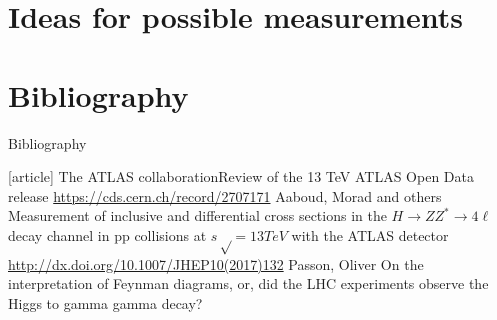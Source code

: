 \documentclass[aspectratio=1610, english]{beamer}
\newcommand{\hzz}{ H\rightarrow ZZ^{*}\rightarrow 4 \ell}
\begin{document}
\section{Ideas for possible measurements}

\section{Bibliography}
\begin{frame}[allowframebreaks]{Bibliography}
	\begin{thebibliography}{9}
		[article]
			{The ATLAS collaboration\newblock Review of the 13 TeV ATLAS Open Data release \newblock \url{https://cds.cern.ch/record/2707171}}
			{Aaboud, Morad and others \newblock Measurement of inclusive and differential cross sections in the $ \hzz $ decay channel in pp collisions at $s√ = 13 TeV$ with the ATLAS detector \newblock \url{http://dx.doi.org/10.1007/JHEP10(2017)132}}
			{Passon, Oliver \newblock On the interpretation of Feynman diagrams, or, did the LHC experiments observe the Higgs to gamma gamma decay?}
	\end{thebibliography}
\end{frame}
\end{document}
